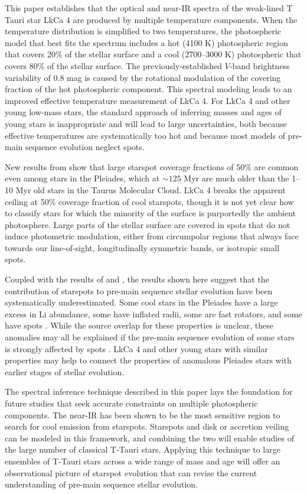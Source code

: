 \documentclass[twocolumn]{emulateapj}%
\begin{document}
This paper establishes that the optical and near-IR spectra of the weak-lined T Tauri star LkCa 4 are produced by multiple temperature components.   When the temperature distribution is simplified to two temperatures, the photospheric model that best fits the spectrum includes a hot (4100 K) photospheric region that covers 20\% of the stellar surface and a cool (2700--3000 K) photospheric that covers 80\% of the stellar surface.  The previously-established $V$-band brightness variability of $0.8$ mag is caused by the rotational modulation of the covering fraction of the hot photospheric component.  This spectral modeling leads to an improved effective temperature measurement of LkCa 4. For LkCa 4 and other young low-mass stars, the standard approach of inferring masses and ages of young stars is inappropriate and will lead to large uncertainties, both because effective temperatures are systematically too hot and because most models of pre-main sequence evolution neglect spots.

New results from \citet{fang2016} show that large starspot coverage fractions of $50\%$ are common even among stars in the Pleiades, which at $\sim 125$ Myr are much older than the 1--10 Myr old stars in the Taurus Molecular Cloud.  LkCa 4 breaks the apparent ceiling at 50\% coverage fraction of cool starspots, though it is not yet clear how to classify stars for which the minority of the surface is purportedly the ambient photosphere.  Large parts of the stellar surface are covered in spots that do not induce photometric modulation, either from circumpolar regions that always face towards our line-of-sight, longitudinally symmetric bands, or isotropic small spots.  

Coupled with the results of \citet{fang2016} and \citet{covey16}, the results shown here suggest that the contribution of starspots to pre-main sequence stellar evolution have been systematically underestimated.  
Some cool stars in the Pleiades have a large excess in Li abundance, some have inflated radii, some are fast rotators, and some have spots \citep[e.g.][]{somers15b}.  While the source overlap for these properties is unclear, these anomalies may all be explained if the pre-main sequence evolution of some stars is strongly affected by spots \citep{somers15}.  
LkCa 4 and other young stars with similar properties may help to connect the properties of anomalous Pleiades stars with earlier stages of stellar evolution.


The spectral inference technique described in this paper lays the foundation for future studies that seek accurate constraints on multiple photospheric components.  The near-IR has been shown to be the most sensitive region to search for cool emission from starspots.  Starspots and disk or accretion veiling can be modeled in this framework, and combining the two will enable studies of the large number of classical T-Tauri stars.  Applying this technique to large ensembles of T-Tauri stars across a wide range of mass and age will offer an observational picture of starspot evolution that can revise the current understanding of pre-main sequence stellar evolution.  
\end{document}
